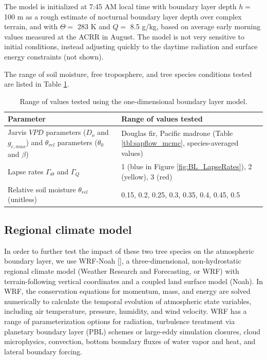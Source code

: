 The model is initialized at 7:45 AM local time with boundary layer depth $h=$ 100 m as a rough estimate of nocturnal boundary layer depth over complex terrain, and with $\Theta=$ 283 K and $Q=$ 8.5 g/kg, based on average early morning values measured at the ACRR in August.  The model is not very sensitive to initial conditions, instead adjusting quickly to the daytime radiation and surface energy constraints (not shown).

The range of soil moisture, free troposphere, and tree species conditions tested are listed in Table \ref{table:BL_1Druns}.  

\begin{table}
\begin{tabular}{ p{7.5cm} p{7.5cm} }
\hline
Parameter & Range of values tested \\ \hline
Jarvis $VPD$ parameters ($D_o$ and $g_{c,max}$) and $\theta_{rel}$ parameters ($\theta_0$ and $\beta$) & Douglas fir, Pacific madrone (Table \ref{tbl:sapflow_mcmc}, species-averaged values)\\
Lapse rates $\Gamma_{\Theta}$ and $\Gamma_Q$ & 1 (blue in Figure \ref{fig:BL_LapseRates}), 2 (yellow), 3 (red)\\
Relative soil moisture $\theta_{rel} $ (unitless) & 0.15, 0.2, 0.25, 0.3, 0.35, 0.4, 0.45, 0.5\\
\hline
\end{tabular}
\caption{Range of values tested using the one-dimensional boundary layer model.}
\label{table:BL_1Druns}
\end{table}

\subsection{Regional climate model}
\label{sec:BL_WRFdesc}
In order to further test the impact of these two tree species on the atmospheric boundary layer, we use WRF-Noah [\cite{skamarock2008}], a three-dimensional, non-hydrostatic regional climate model (Weather Research and Forecasting, or WRF) with terrain-following vertical coordinates and a coupled land surface model (Noah).  In WRF, the conservation equations for momentum, mass, and energy are solved numerically to calculate the temporal evolution of atmospheric state variables, including air temperature, pressure, humidity, and wind velocity.  WRF has a range of parameterization options for radiation, turbulence treatment via planetary boundary layer (PBL) schemes or large-eddy simulation closures, cloud microphysics, convection, bottom boundary fluxes of water vapor and heat, and lateral boundary forcing.  

